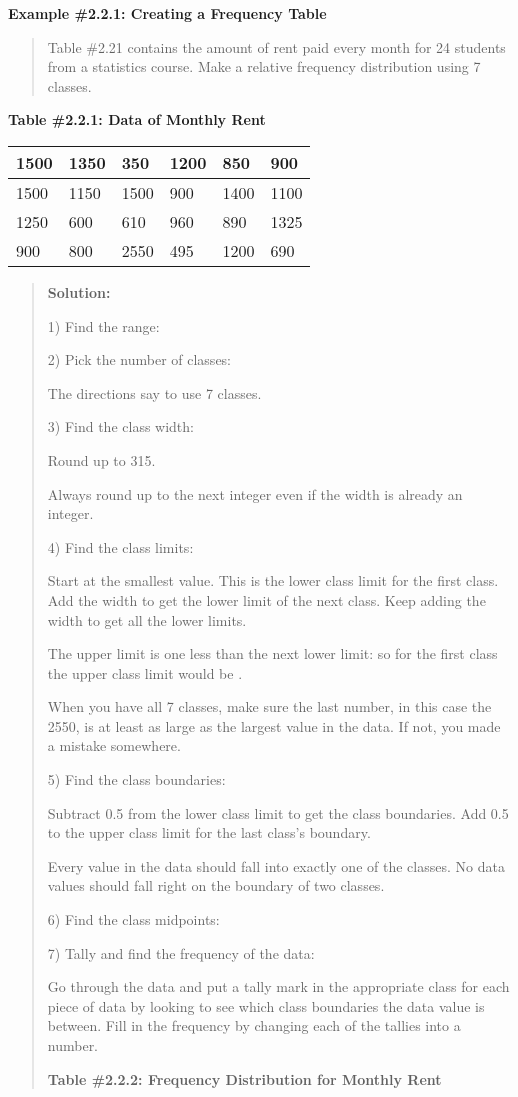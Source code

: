 \documentclass[]{book}
\begin{document}
\textbf{Example \#2.2.1: Creating a Frequency Table}

\begin{quote}
Table \#2.21 contains the amount of rent paid every month for 24
students from a statistics course. Make a relative frequency
distribution using 7 classes.
\end{quote}

\textbf{Table \#2.2.1: Data of Monthly Rent}

\begin{longtable}[]{@{}llllll@{}}
\toprule
1500 & 1350 & 350 & 1200 & 850 & 900\tabularnewline
\midrule
\endhead
1500 & 1150 & 1500 & 900 & 1400 & 1100\tabularnewline
1250 & 600 & 610 & 960 & 890 & 1325\tabularnewline
900 & 800 & 2550 & 495 & 1200 & 690\tabularnewline
\bottomrule
\end{longtable}

\begin{quote}
\textbf{Solution:}

1) Find the range:

2) Pick the number of classes:

The directions say to use 7 classes.

3) Find the class width:

Round up to 315.

Always round up to the next integer even if the width is already an
integer.

4) Find the class limits:

Start at the smallest value. This is the lower class limit for the
first class. Add the width to get the lower limit of the next class.
Keep adding the width to get all the lower limits.

The upper limit is one less than the next lower limit: so for the
first class the upper class limit would be .

When you have all 7 classes, make sure the last number, in this case
the 2550, is at least as large as the largest value in the data. If
not, you made a mistake somewhere.

5) Find the class boundaries:

Subtract 0.5 from the lower class limit to get the class boundaries.
Add 0.5 to the upper class limit for the last class's boundary.

Every value in the data should fall into exactly one of the classes.
No data values should fall right on the boundary of two classes.

6) Find the class midpoints:

7) Tally and find the frequency of the data:

Go through the data and put a tally mark in the appropriate class for
each piece of data by looking to see which class boundaries the data
value is between. Fill in the frequency by changing each of the
tallies into a number.

\textbf{Table \#2.2.2: Frequency Distribution for Monthly Rent}
\end{quote}
\end{document}
